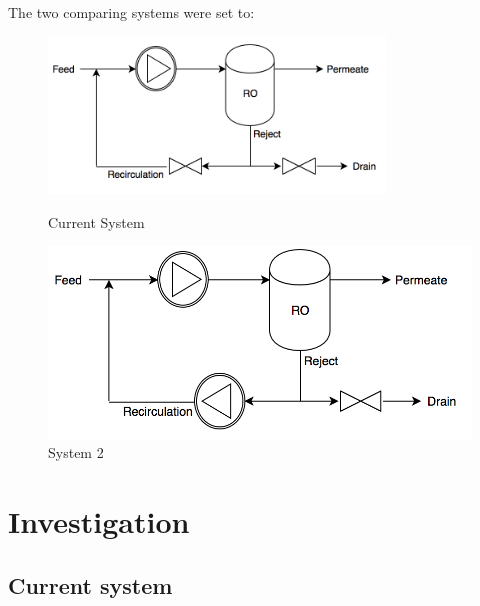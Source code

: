 The two comparing systems were set to:\\
\begin{figure}[h]
\centering
\begin{minipage}{.5\textwidth}
    \centering
    \includegraphics[width=0.8\textwidth]{Sys1}
    \caption{Current System}
    \label{fig:System1}
\end{minipage}%
\begin{minipage}{.5\textwidth}
  \centering
  \includegraphics[width=.8\linewidth]{Sys2}
  \caption{System 2}
  \label{fig:System2}
\end{minipage}
\end{figure}

\newpage

\section{Investigation}
\subsection{Current system}

